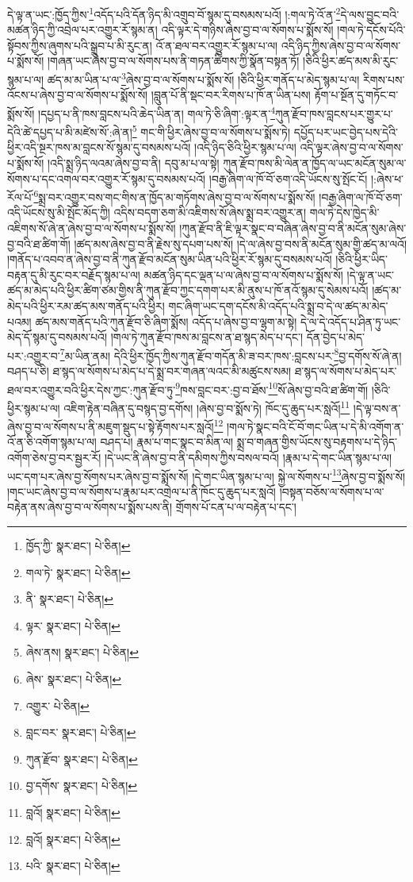 དེ་ལྟ་ན་ཡང་:ཁྱོད་ཀྱིས་\footnote{ཁྱོད་ཀྱི་  སྣར་ཐང་།  པེ་ཅིན། }འདོད་པའི་དོན་ཉིད་མི་འགྲུབ་བོ་སྙམ་དུ་བསམས་པའོ། །:གལ་ཏེ་འོ་ན་\footnote{གལ་ཏེ་  སྣར་ཐང་།  པེ་ཅིན། }དེ་ལས་བྱུང་བའི་མཚན་ཉིད་ཀྱི་འབྲེལ་པར་འགྱུར་རོ་སྙམ་ན། འདི་ལྟར་དེ་གཉིས་ཞེས་བྱ་བ་ལ་སོགས་པ་སྨོས་སོ། །གལ་ཏེ་དངོས་པོའི་སྟོབས་ཀྱིས་ཞུགས་པའི་སྒྲུབ་པ་མི་རུང་ན། འོ་ན་ཐལ་བར་འགྱུར་རོ་སྙམ་པ་ལ། འདི་ཉིད་ཀྱིས་ཞེས་བྱ་བ་ལ་སོགས་པ་སྨོས་སོ། །གཞན་ཡང་ཞེས་བྱ་བ་ལ་སོགས་པས་ནི་གཏན་ཚིགས་ཀྱི་སྣོན་བསྟན་ཏོ། །ཅིའི་ཕྱིར་ཚད་མས་མི་རུང་སྙམ་པ་ལ། ཚད་མ་མ་ཡིན་པ་ལ་\footnote{ནི་  སྣར་ཐང་།  པེ་ཅིན། }ཞེས་བྱ་བ་ལ་སོགས་པ་སྨོས་སོ། །ཅིའི་ཕྱིར་གནོད་པ་མེད་སྙམ་པ་ལ། རིགས་པས་འོངས་པ་ཞེས་བྱ་བ་ལ་སོགས་པ་སྨོས་སོ། །བླུན་པོ་ནི་སྡང་བར་རིགས་པ་ཁོ་ན་ཡིན་པས། རྟོག་པ་སྔོན་དུ་གཏོང་བ་སྨོས་སོ། །དཔྱད་པ་ནི་ཁས་བླངས་པའི་ཆེད་ཡིན་ན། གལ་ཏེ་ཅི་ཞིག་:ལྟར་ན་\footnote{ལྟར་  སྣར་ཐང་།  པེ་ཅིན། }ཀུན་རྫོབ་ཁས་བླངས་པར་གྱུར་པ་དེའི་ཚེ་དཔྱད་པ་མི་མཛེས་སོ་:ཞེ་ན།\footnote{ཞེས་ནས།  སྣར་ཐང་།  པེ་ཅིན། } གང་གི་ཕྱིར་ཞེས་བྱ་བ་ལ་སོགས་པ་སྨོས་ཏེ། དཔྱོད་པར་ཡང་བྱེད་པས་དེའི་ཕྱིར་འདི་སྔར་ཁས་མ་བླངས་སོ་སྙམ་དུ་བསམས་པའོ། །འདི་ཉིད་ཅིའི་ཕྱིར་སྙམ་པ་ལ། འདི་ལྟར་ཞེས་བྱ་བ་ལ་སོགས་པ་སྨོས་སོ། །འདི་སྨྲ་ཉིད་ལའམ་ཞེས་བྱ་བ་ནི། དབུ་མ་པ་ལ་སྟེ། ཀུན་རྫོབ་ཁས་མི་ལེན་ན་ཁྱོད་ལ་ཡང་མངོན་སུམ་ལ་སོགས་པ་དང་འགལ་བར་འགྱུར་རོ་སྙམ་དུ་བསམས་པའོ། །བརྒྱ་ཞིག་ལ་ཁོ་བོ་ཅག་འདི་ཡོངས་སུ་སྤོང་ངོ། །:ཞེས་ཕ་རོལ་པོ་\footnote{ཞེས་  སྣར་ཐང་།  པེ་ཅིན། }སྨྲ་བར་འགྱུར་བས་གང་གིས་ན་ཁྱོད་མ་གཏོགས་ཞེས་བྱ་བ་ལ་སོགས་པ་སྨོས་སོ། །བརྒྱ་ཞིག་ལ་ཁོ་བོ་ཅག་འདི་ཡོངས་སུ་མི་སྤོང་མོད་ཀྱི། འདིས་བདག་ཅག་མི་འཇིགས་སོ་ཞེས་སྨྲ་བར་འགྱུར་ན། གལ་ཏེ་དེས་ཁྱེད་མི་འཇིགས་སོ་ཞེ་ན་ཞེས་བྱ་བ་ལ་སོགས་པ་སྨོས་སོ། །ཀུན་རྫོབ་ནི་ཇི་ལྟར་སྣང་བ་བཞིན་ཞེས་བྱ་བ་ནི་མངོན་སུམ་ཞེས་བྱ་བའི་ཐ་ཚིག་གོ། །ཚད་མས་ཞེས་བྱ་བ་ནི་རྗེས་སུ་དཔག་པས་སོ། །དེ་ལ་ཞེས་བྱ་བས་ནི་མངོན་སུམ་གྱི་ཚད་མ་ལའོ། །གནོད་པ་འབབ་ན་ཞེས་བྱ་བ་ནི་ཀུན་རྫོབ་མངོན་སུམ་ཡིན་པའི་ཕྱིར་རོ་སྙམ་དུ་བསམས་པའོ། །ཅིའི་ཕྱིར་ཡིད་བརྟན་དུ་མི་རུང་བར་བརྗོད་སྙམ་པ་ལ། མཚན་ཉིད་དང་ལྡན་པ་ལ་ཞེས་བྱ་བ་ལ་སོགས་པ་སྨོས་སོ། །དེ་ལྟ་ན་ཡང་ཚད་མ་མེད་པའི་ཕྱིར་ཚིག་ཙམ་གྱིས་ནི་ཀུན་རྫོབ་ཀྱང་དགག་པར་མི་ནུས་པ་ཁོ་ནའོ་སྙམ་དུ་སེམས་པའོ། །ཚད་མ་མེད་པའི་ཕྱིར་རམ་ཚད་མས་གནོད་པའི་ཕྱིར། གང་ཞིག་ཡང་དག་དངོས་མི་འདོད་པའི་སྨྲ་བ་དེ་ལ་ཚད་མ་མེད་པའམ། ཚད་མས་གནོད་པའི་ཀུན་རྫོབ་ཅི་ཞིག་སྨོས། འདོད་པ་ཞེས་བྱ་བ་ལྷག་མ་སྟེ། དེ་ལ་དེ་འདོད་པ་ཤིན་ཏུ་ཡང་མེད་དོ་སྙམ་དུ་བསམས་པའོ། །གལ་ཏེ་ཀུན་རྫོབ་ཁས་མ་བླངས་ན་ཐ་སྙད་མེད་པ་དང་། དོན་བྱེད་པ་མེད་པར་:འགྱུར་བ་\footnote{འགྱུར་  པེ་ཅིན། }མ་ཡིན་ནམ། དེའི་ཕྱིར་ཁྱོད་ཀྱིས་ཀུན་རྫོབ་གདོན་མི་ཟ་བར་ཁས་:བླངས་པར་\footnote{བླང་བར་  སྣར་ཐང་།  པེ་ཅིན། }བྱ་དགོས་སོ་ཞེ་ན། བཤད་པ་ཅི། ཐ་སྙད་ལ་སོགས་པ་མེད་པ་དེ་སྨྲ་བར་གཞན་ལའང་མི་མཚུངས་སམ། ཐ་སྙད་ལ་སོགས་པ་མེད་པར་ཐལ་བར་འགྱུར་བའི་ཕྱིར་དེས་ཀྱང་:ཀུན་རྫོབ་ཏུ་\footnote{ཀུན་རྫོབ་  སྣར་ཐང་།  པེ་ཅིན། }ཁས་བླང་བར་:བྱ་བ་ཐོས་\footnote{བྱ་དགོས་  སྣར་ཐང་།  པེ་ཅིན། }སོ་ཞེས་བྱ་བའི་ཐ་ཚིག་གོ། །ཅིའི་ཕྱིར་སྙམ་པ་ལ། འཇིག་རྟེན་བཞིན་དུ་བསྙད་བྱ་དགོས། །ཞེས་བྱ་བ་སྨོས་ཏེ། ཁོང་དུ་ཆུད་པར་སླའོ།\footnote{བླའོ།  སྣར་ཐང་།  པེ་ཅིན། } །དེ་ལྟ་བས་ན་ཞེས་བྱ་བ་ལ་སོགས་པ་ནི་མཇུག་སྡུད་པ་སྟེ་རྟོགས་པར་སླའོ།\footnote{བླའོ།  སྣར་ཐང་།  པེ་ཅིན། } །གལ་ཏེ་སྣང་བའི་ངོ་བོ་གང་ཡིན་པ་དེ་མི་འགོག་ན་འོ་ན་ཅི་འགོག་སྙམ་པ་ལ། བཤད་པ། རྣམ་པ་གང་སྣང་བ་མིན་ལ། སྨྲ་བ་གཞན་གྱིས་ཡོངས་སུ་བརྟགས་པ་དེ་ཉིད་འགོག་ཅེས་བྱ་བར་སྦྱར་རོ། །དེ་ཡང་ནི་ཞེས་བྱ་བ་ནི་དམིགས་ཀྱིས་བསལ་བའོ། །རྣམ་པ་དེ་གང་ཡིན་སྙམ་པ་ལ། ཡང་དག་པར་ཞེས་བྱ་སོགས་པར་ཞེས་བྱ་བ་སྨོས་སོ། །དེ་གང་ཡིན་སྙམ་པ་ལ། སྐྱེ་ལ་སོགས་པ་\footnote{པའི་  སྣར་ཐང་།  པེ་ཅིན། }ཞེས་བྱ་བ་སྨོས་སོ། །གང་ཡང་ཞེས་བྱ་བ་ལ་སོགས་པ་རྣམ་པར་འགྲེལ་པ་ནི་ཁོང་དུ་ཆུད་པར་སླའོ། །བསྟན་བཅོས་ལ་སོགས་པ་ལ་བརྟེན་ནས་ཞེས་བྱ་བ་ལ་སོགས་པ་སྨོས་པས་ནི། གྲོགས་པོ་ངན་པ་ལ་བརྟེན་པ་དང་། 